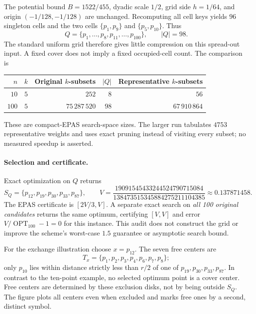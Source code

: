 \documentclass[a4paper,12pt]{article}
\newcommand{\OPT}{\operatorname{OPT}}
\numberwithin{equation}{section}
\begin{document}
The potential bound $B=1522/455$, dyadic scale $1/2$, grid side $h=1/64$, and origin
$(-1/128,-1/128)$ are unchanged. Recomputing all cell keys yields $96$ singleton cells and the two
cells $\{p_1,p_9\}$ and $\{p_5,p_{10}\}$. Thus
\[
 Q=\{p_1,\ldots,p_8,p_{11},\ldots,p_{100}\},\qquad |Q|=98.
\]
The standard uniform grid therefore gives little compression on this spread-out input. A fixed
cover does not imply a fixed occupied-cell count. The comparison is
\begin{center}\small
\begin{tabular}{@{}rrrrr@{}}\toprule
$n$ & $k$ & Original $k$-subsets & $|Q|$ & Representative $k$-subsets\\\midrule
$10$ & $5$ & $252$ & $8$ & $56$\\
$100$ & $5$ & $75\,287\,520$ & $98$ & $67\,910\,864$\\\bottomrule
\end{tabular}
\end{center}
These are compact-EPAS search-space sizes. The larger run tabulates $4753$ representative weights
and uses exact pruning instead of visiting every subset; no measured speedup is asserted.

\paragraph{Selection and certificate.}
Exact optimization on $Q$ returns
\[
 S_Q=\{p_{12},p_{19},p_{30},p_{33},p_{87}\},\qquad
 V=\frac{19091545433244524790715084}{138473515345884275211104385}
   \approx0.137871458.
\]
The EPAS certificate is $[2V/3,V]$. A separate exact search on \emph{all 100 original candidates}
returns the same optimum, certifying $[V,V]$ and error $V/\OPT_{100}-1=0$ for this instance. This
audit does not construct the grid or improve the scheme's worst-case $1.5$ guarantee or asymptotic
search bound.

For the exchange illustration choose $x=p_{12}$. The seven free centers are
\[
 T_x=\{p_1,p_2,p_3,p_4,p_6,p_7,p_8\};
\]
only $p_{10}$ lies within distance strictly less than $r/2$ of one of
$p_{19},p_{30},p_{33},p_{87}$. In contrast to the ten-point example, no selected optimum point is
a cover center. Free centers are determined by these exclusion disks, not by being outside $S_Q$.
The figure plots all centers even when excluded and marks free ones by a second, distinct symbol.
\end{document}
